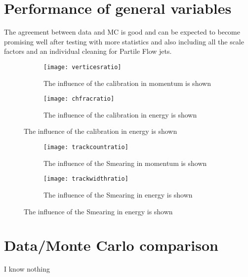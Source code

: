 \section{Performance of general variables}


The agreement between data and MC is good and can be expected to become promising well after testing with more statistics and also including all the scale factors and an individual cleaning for Partile Flow jets.

\begin{figure}[h]
\centering
\begin{subfigure}[b]{0.5\figwidth}
\texttt{[image: verticesratio]}
\caption[Influence of the JES on the transversal momentum]{The influence of the calibration in momentum is shown}
\label{fig:vertices}
\end{subfigure}
\quad
\begin{subfigure}[b]{0.5\figwidth}
\texttt{[image: chfracratio]}
\caption[Influence of the JES on the energy]{The influence of the calibration in energy is shown}
\label{fig:chfrac}
\end{subfigure}
\end{figure}


\begin{figure}[h]
\centering
\begin{subfigure}[b]{0.5\figwidth}
\texttt{[image: trackcountratio]}
\caption[Influence of the Smearing on the transversal momentum]{The influence of the Smearing in momentum is shown}
\label{fig:trackcount}
\end{subfigure}
\quad
\begin{subfigure}[b]{0.5\figwidth}
\texttt{[image: trackwidthratio]}
\caption[Influence of the Smearing on the energy]{The influence of the Smearing in energy is shown}
\label{fig:trackwidth}
\end{subfigure}
\end{figure}


\section{Data/Monte Carlo comparison}
\label{results}

I know nothing